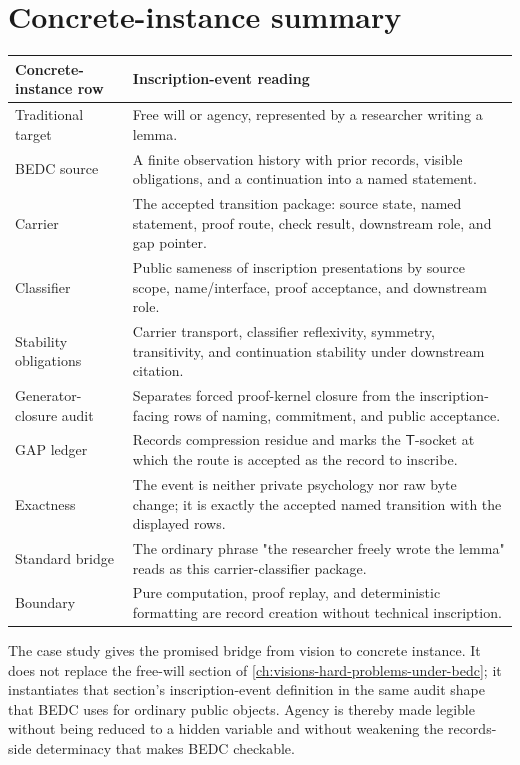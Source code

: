 \section{Concrete-instance summary}
\label{sec:inscription-event-concrete-instance-summary}

\begin{longtable}{p{}p{}}
\toprule
\textbf{Concrete-instance row} & \textbf{Inscription-event reading} \\
\midrule
Traditional target & Free will or agency, represented by a researcher writing a lemma. \\
BEDC source & A finite observation history with prior records, visible obligations, and a continuation into a named statement. \\
Carrier & The accepted transition package: source state, named statement, proof route, check result, downstream role, and gap pointer. \\
Classifier & Public sameness of inscription presentations by source scope, name/interface, proof acceptance, and downstream role. \\
Stability obligations & Carrier transport, classifier reflexivity, symmetry, transitivity, and continuation stability under downstream citation. \\
Generator-closure audit & Separates forced proof-kernel closure from the inscription-facing rows of naming, commitment, and public acceptance. \\
GAP ledger & Records compression residue and marks the $\mathsf{T}$-socket at which the route is accepted as the record to inscribe. \\
Exactness & The event is neither private psychology nor raw byte change; it is exactly the accepted named transition with the displayed rows. \\
Standard bridge & The ordinary phrase "the researcher freely wrote the lemma" reads as this carrier-classifier package. \\
Boundary & Pure computation, proof replay, and deterministic formatting are record creation without technical inscription. \\
\bottomrule
\end{longtable}

The case study gives the promised bridge from vision to concrete instance.
It does not replace the free-will section of
\autoref{ch:visions-hard-problems-under-bedc}; it instantiates that section's
inscription-event definition in the same audit shape that BEDC uses for
ordinary public objects.  Agency is thereby made legible without being
reduced to a hidden variable and without weakening the records-side
determinacy that makes BEDC checkable.

